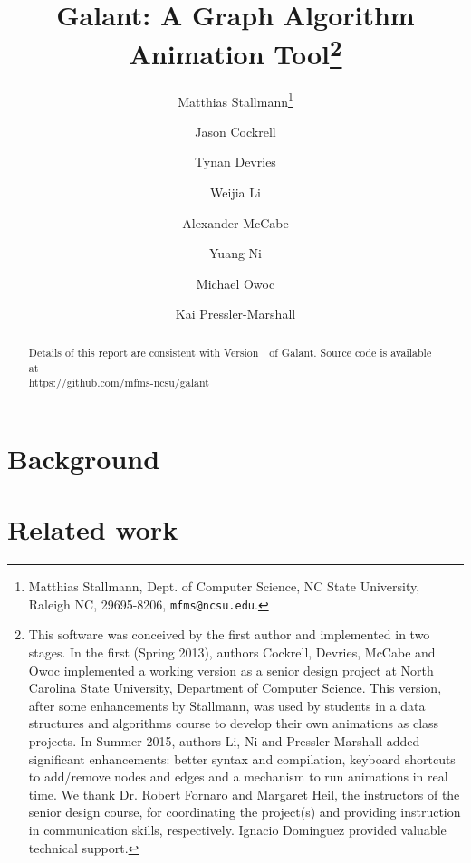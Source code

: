 \documentclass{article}
\begin{document}
\title{Galant: A Graph Algorithm Animation Tool\thanks{
    This software was conceived by the first author and implemented in
    two stages.
    In the first (Spring 2013), authors Cockrell, Devries, McCabe and Owoc implemented a
    working version as
    a senior design project at North Carolina
    State University, Department of Computer Science.
    This version, after some enhancements by Stallmann,
    was used by students in a data structures and algorithms course to develop
    their own animations as class projects.
    In Summer 2015, authors Li, Ni and Pressler-Marshall
    added significant enhancements: better syntax and compilation, keyboard shortcuts to add/remove nodes and edges and a mechanism to run animations in real time.
    We thank Dr. Robert Fornaro and Margaret Heil, the instructors of the senior design course, for
    coordinating the project(s) and providing instruction in communication
    skills, respectively. Ignacio Dominguez provided valuable technical
    support.
  }
}
\author{Matthias Stallmann\thanks{Matthias Stallmann, Dept. of Computer
    Science, NC State University, Raleigh NC, 29695-8206,
    \texttt{mfms@ncsu.edu}.
  }
  \and Jason Cockrell
  \and Tynan Devries
  \and Weijia Li
  \and Alexander McCabe
  \and Yuang Ni
  \and Michael Owoc
  \and Kai Pressler-Marshall
}

\maketitle

\begin{abstract}



Details of this report are consistent with Version~\VERSION\ of Galant.
Source code is available at\\
\hspace*{2em}\url{https://github.com/mfms-ncsu/galant}
 
\end{abstract}

\section{Background}



\section{Related work}
\end{document}
